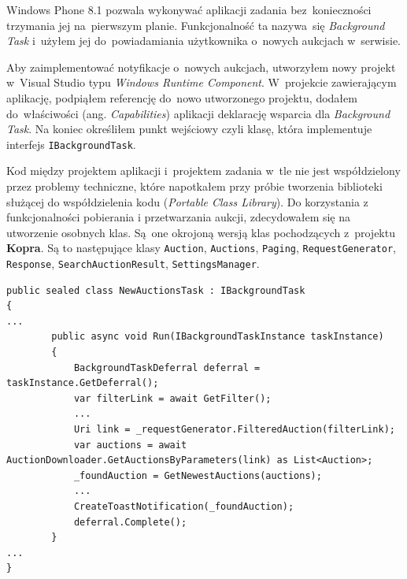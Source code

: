 \documentclass[a4paper,twoside,titlepage,openright]{book}
\begin{document}
Windows Phone 8.1 pozwala wykonywać aplikacji zadania bez~konieczności trzymania jej na~pierwszym planie. Funkcjonalność ta nazywa~się \textit{Background Task} i~użyłem jej do~powiadamiania użytkownika o~nowych aukcjach w~serwisie.

Aby zaimplementować notyfikacje o~nowych aukcjach, utworzyłem nowy projekt w~Visual Studio typu \textit{Windows Runtime Component}. W~projekcie zawierającym aplikację, podpiąłem referencję do~nowo utworzonego projektu, dodałem do~właściwości (ang. \textit{Capabilities}) aplikacji deklarację wsparcia dla \textit{Background Task}. Na koniec określiłem punkt wejściowy czyli klasę, która implementuje interfejs \texttt{IBackgroundTask}.

Kod między projektem aplikacji i~projektem zadania w~tle nie jest współdzielony przez problemy techniczne, które napotkałem przy próbie tworzenia biblioteki służącej do współdzielenia kodu (\textit{Portable Class Library}). Do korzystania z funkcjonalności pobierania i przetwarzania aukcji, zdecydowałem się na utworzenie osobnych klas. Są~one okrojoną wersją klas pochodzących z~projektu \textbf{Kopra}. Są to następujące klasy \texttt{Auction}, \texttt{Auctions}, \texttt{Paging}, \texttt{RequestGenerator}, \texttt{Response}, \texttt{SearchAuctionResult}, \texttt{SettingsManager}.

\noindent
\begin{lstlisting}[caption=Implementacja wykonywanego zadania w~tle., label=lst:test]
public sealed class NewAuctionsTask : IBackgroundTask
{
...
        public async void Run(IBackgroundTaskInstance taskInstance) 
        {
        	BackgroundTaskDeferral deferral = taskInstance.GetDeferral();
        	var filterLink = await GetFilter();
        	...
        	Uri link = _requestGenerator.FilteredAuction(filterLink);
        	var auctions = await AuctionDownloader.GetAuctionsByParameters(link) as List<Auction>;
        	_foundAuction = GetNewestAuctions(auctions);
			...            
			CreateToastNotification(_foundAuction);
        	deferral.Complete();
		}
...
}

\end{lstlisting}
 
\end{document}
